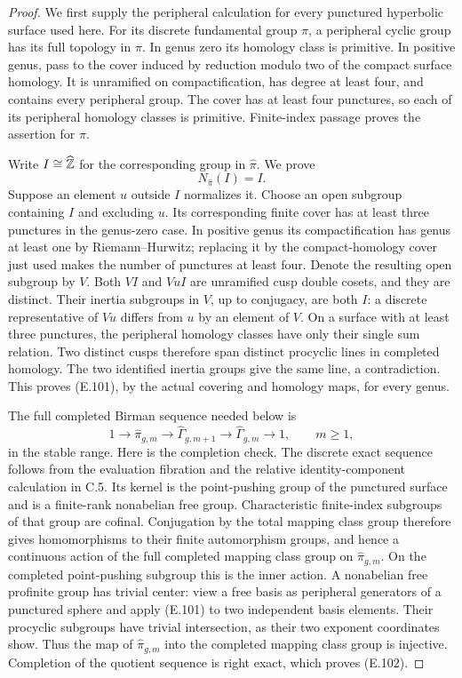 \begin{proof}
We first supply the peripheral calculation for every
punctured hyperbolic surface used here.  For its discrete
fundamental group $\pi$, a peripheral cyclic group has its
full topology in $\pi$.  In genus zero its homology class
is primitive.  In positive genus, pass to the cover induced
by reduction modulo two of the compact surface homology.
It is unramified on compactification, has degree at least
four, and contains every peripheral group.  The cover has
at least four punctures, so each of its peripheral homology
classes is primitive.  Finite-index passage proves the
assertion for $\pi$.

Write $I\cong\widehat{\mathbb Z}$ for the corresponding group in
$\widehat\pi$.  We prove
\[
                  N_{\widehat\pi}(I)=I.                       \tag{E.101}
\]
Suppose an element $u$ outside $I$ normalizes it.  Choose
an open subgroup containing $I$ and excluding $u$.
Its corresponding finite cover has at least three punctures
in the genus-zero case.  In positive genus its compactification
has genus at least one by Riemann--Hurwitz; replacing it by
the compact-homology cover just used makes the number of
punctures at least four.  Denote the resulting open subgroup
by $V$.  Both $VI$ and $VuI$ are unramified cusp double
cosets, and they are distinct.  Their inertia subgroups in
$V$, up to conjugacy, are both $I$: a discrete representative
of $Vu$ differs from $u$ by an element of $V$.
On a surface with at least three punctures, the peripheral
homology classes have only their single sum relation.
Two distinct cusps therefore span distinct procyclic lines
in completed homology.  The two identified inertia groups
give the same line, a contradiction.  This proves (E.101),
by the actual covering and homology maps, for every genus.

The full completed Birman sequence needed below is
\[
 1\longrightarrow\widehat\pi_{g,m}\longrightarrow
 \widehat\Gamma_{g,m+1}\longrightarrow
 \widehat\Gamma_{g,m}\longrightarrow1,\qquad m\geq1,           \tag{E.102}
\]
in the stable range.  Here is the completion check.
The discrete exact sequence follows from the evaluation
fibration and the relative identity-component calculation
in C.5.  Its kernel is the point-pushing group of the
punctured surface and is a finite-rank nonabelian free group.
Characteristic finite-index subgroups of that group are
cofinal.  Conjugation by the total mapping class group
therefore gives homomorphisms to their finite automorphism
groups, and hence a continuous action of the full completed
mapping class group on $\widehat\pi_{g,m}$.
On the completed point-pushing subgroup this is the inner
action.  A nonabelian free profinite group has trivial
center: view a free basis as peripheral generators of a
punctured sphere and apply (E.101) to two independent basis
elements.  Their procyclic subgroups have trivial intersection,
as their two exponent coordinates show.
Thus the map of $\widehat\pi_{g,m}$ into the completed
mapping class group is injective.  Completion of the quotient
sequence is right exact, which proves (E.102).


\end{proof}
